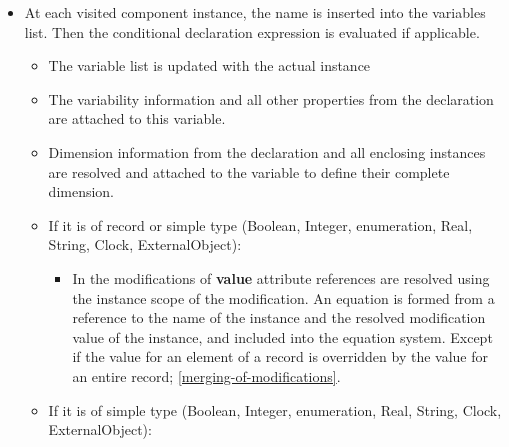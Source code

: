 \documentclass[10pt,a4paper]{report}
\begin{document}
\begin{itemize}
\item
  At each visited component instance, the name is inserted into the
  variables list. Then the conditional declaration expression is
  evaluated if applicable.

  \begin{itemize}
  \item
    The variable list is updated with the actual instance
  \item
    The variability information and all other properties from the
    declaration are attached to this variable.
  \item
    Dimension information from the declaration and all enclosing
    instances are resolved and attached to the variable to define their
    complete dimension.
  \item
    If it is of record or simple type (Boolean, Integer, enumeration,
    Real, String, Clock, ExternalObject):

    \begin{itemize}
    \item
      In the modifications of \textbf{value} attribute references are
      resolved using the instance scope of the modification. An equation
      is formed from a reference to the name of the instance and the
      resolved modification value of the instance, and included into the
      equation system. Except if the value for an element of a record is
      overridden by the value for an entire record; \ref{merging-of-modifications}.
    \end{itemize}
  \item
    If it is of simple type (Boolean, Integer, enumeration, Real,
    String, Clock, ExternalObject):


\end{itemize}
\end{itemize}
\end{document}
